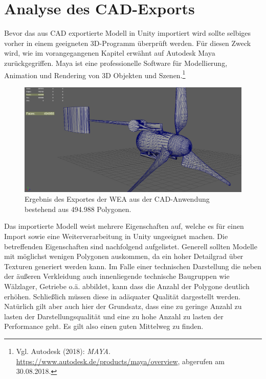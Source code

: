 \section{Analyse des CAD-Exports}
\label{sec:AnalyseDesCAD-Exports}
Bevor das aus CAD exportierte Modell in Unity importiert wird sollte selbiges vorher in einem geeigneten 3D-Programm überprüft werden. Für diesen Zweck wird, wie im vorangegangenen Kapitel erwähnt auf Autodesk Maya zurückgegriffen. Maya ist eine professionelle Software für Modellierung, Animation und Rendering von 3D Objekten und Szenen.\footnote{Vgl. Autodesk  (2018): \textit{MAYA}.\newline
\url{https://www.autodesk.de/products/maya/overview},\newline 
abgerufen am 30.08.2018.}

\begin{figure}[H]
	\centering
	\captionsetup{width=1\textwidth}
	\includegraphics[keepaspectratio, width=1\textwidth]{bildquellen/WEA-Vergleich1}
	\caption{Ergebnis des Exportes der WEA aus der CAD-Anwendung bestehend aus 494.988 Polygonen.}
	\label{fig:2.2}
\end{figure}

Das importierte Modell  weist mehrere Eigenschaften auf, welche es für einen Import sowie eine Weiterverarbeitung in Unity ungeeignet machen. Die betreffenden Eigenschaften sind nachfolgend aufgelistet. 
Generell sollten Modelle mit möglichst wenigen Polygonen auskommen, da ein hoher Detailgrad über Texturen generiert werden kann. Im Falle einer technischen Darstellung die neben der äußeren Verkleidung auch innenliegende technische Baugruppen wie Wälzlager, Getriebe o.ä. abbildet, kann dass die Anzahl der Polygone deutlich erhöhen. Schließlich müssen diese in adäquater Qualität dargestellt werden. Natürlich gilt aber auch hier der Grundsatz, dass eine zu geringe Anzahl zu lasten der Darstellungsqualität und eine zu hohe Anzahl zu lasten der Performance geht. Es gilt also einen guten Mittelweg zu finden. 


